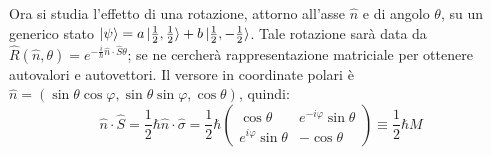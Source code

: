 \documentclass[11pt, a4paper]{scrartcl} %
\numberwithin{equation}{subsection}
\theoremstyle{style2}
\theoremstyle{style1}
\begin{document}
Ora si studia l'effetto di una rotazione, attorno all'asse $\hat{n}$ e di angolo $\theta $, su un generico stato $\ket{\psi } = a  \ket{\frac{1}{2}, \frac{1}{2}} + b  \ket{\frac{1}{2}, -\frac{1}{2}} $.
Tale rotazione sar\`a data da $\hat{R}(\hat{n},\theta ) = e^{- \frac{i}{\hbar }\hat{n}\cdot \hat{S}\theta } $; se ne cercher\`a rappresentazione matriciale per ottenere autovalori e autovettori.
Il versore in coordinate polari \`e $\hat{n} = (\sin \theta  \cos\varphi  , \sin \theta  \sin \varphi , \cos\theta )$, quindi:
\[
	\hat{n}\cdot \hat{S} = \frac{1}{2}\hbar \hat{n}\cdot \hat{\sigma }= \frac{1}{2}\hbar \begin{pmatrix} \cos \theta  & e^{-i \varphi } \sin \theta \\ e^{i\varphi } \sin \theta  & - \cos \theta  \end{pmatrix} \equiv \frac{1}{2}\hbar M
\] 
\end{document}

